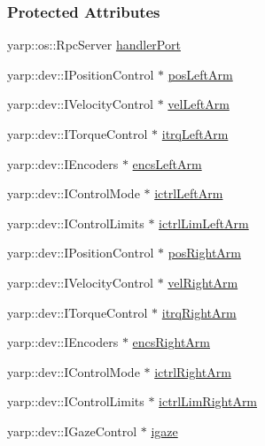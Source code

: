\subsubsection*{Protected Attributes}
\begin{DoxyCompactItemize}
\item 
yarp\+::os\+::\+Rpc\+Server \hyperlink{group__babbling_afc20fc52862c90c52ee56628e1e52d65}{handler\+Port}
\item 
yarp\+::dev\+::\+I\+Position\+Control $\ast$ \hyperlink{group__babbling_ae3f0e78b0005659b56d4aabc7868c9a9}{pos\+Left\+Arm}
\item 
yarp\+::dev\+::\+I\+Velocity\+Control $\ast$ \hyperlink{group__babbling_a3b87f9dd07393fb9f190bb8e4ced3662}{vel\+Left\+Arm}
\item 
yarp\+::dev\+::\+I\+Torque\+Control $\ast$ \hyperlink{group__babbling_a44d279cd82628df4a5e54bb780999157}{itrq\+Left\+Arm}
\item 
yarp\+::dev\+::\+I\+Encoders $\ast$ \hyperlink{group__babbling_ab5de0e5815a8c642e2c5f804675f8734}{encs\+Left\+Arm}
\item 
yarp\+::dev\+::\+I\+Control\+Mode $\ast$ \hyperlink{group__babbling_ad4dab457a0cb02fe180c88c2c9807131}{ictrl\+Left\+Arm}
\item 
yarp\+::dev\+::\+I\+Control\+Limits $\ast$ \hyperlink{group__babbling_a0e0df17a1b42f3732896af945b5b04ac}{ictrl\+Lim\+Left\+Arm}
\item 
yarp\+::dev\+::\+I\+Position\+Control $\ast$ \hyperlink{group__babbling_abddc746bc2eae62a162fc48cdc5f5553}{pos\+Right\+Arm}
\item 
yarp\+::dev\+::\+I\+Velocity\+Control $\ast$ \hyperlink{group__babbling_a1f4d5e9370fad5b0637d759cada192f1}{vel\+Right\+Arm}
\item 
yarp\+::dev\+::\+I\+Torque\+Control $\ast$ \hyperlink{group__babbling_a4b5a1226c09e0c66f06a9d2e0aa73e86}{itrq\+Right\+Arm}
\item 
yarp\+::dev\+::\+I\+Encoders $\ast$ \hyperlink{group__babbling_a540345074d41b623588cb5e94d18a8c5}{encs\+Right\+Arm}
\item 
yarp\+::dev\+::\+I\+Control\+Mode $\ast$ \hyperlink{group__babbling_a8d08c70bd472b1d00bd55d8aa21ffd63}{ictrl\+Right\+Arm}
\item 
yarp\+::dev\+::\+I\+Control\+Limits $\ast$ \hyperlink{group__babbling_a3e5cfc21913105c3fd5ece25a1b2a73d}{ictrl\+Lim\+Right\+Arm}
\item 
yarp\+::dev\+::\+I\+Gaze\+Control $\ast$ \hyperlink{group__babbling_aa584e5aa3e9bd4d5a0e0ae4de7d014e2}{igaze}

\end{DoxyCompactItemize}

